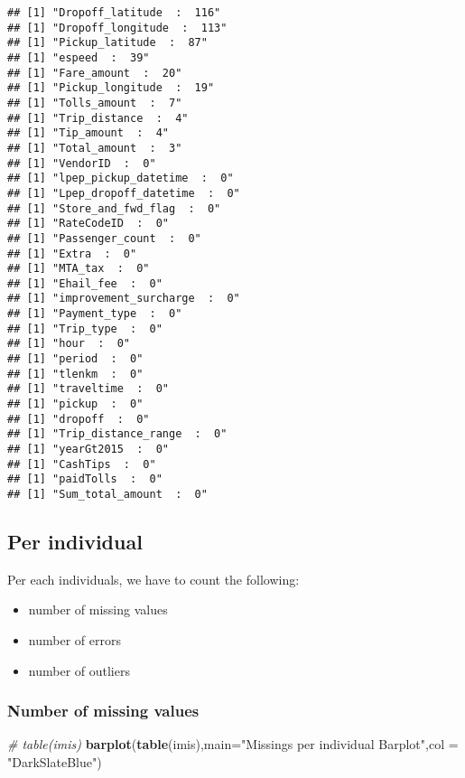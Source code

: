 \documentclass[
  18pt,
  a4paper]{article}
\newenvironment{Shaded}{\begin{snugshade}}{\end{snugshade}}
\newcommand{\CommentTok}[1]{\textcolor[rgb]{0.56,0.35,0.01}{\textit{#1}}}
\newcommand{\DataTypeTok}[1]{\textcolor[rgb]{0.13,0.29,0.53}{#1}}
\newcommand{\KeywordTok}[1]{\textcolor[rgb]{0.13,0.29,0.53}{\textbf{#1}}}
\newcommand{\NormalTok}[1]{#1}
\newcommand{\StringTok}[1]{\textcolor[rgb]{0.31,0.60,0.02}{#1}}
\providecommand{\tightlist}{%
  \setlength{\itemsep}{0pt}\setlength{\parskip}{0pt}}
\begin{document}
\begin{verbatim}
## [1] "Dropoff_latitude  :  116"
## [1] "Dropoff_longitude  :  113"
## [1] "Pickup_latitude  :  87"
## [1] "espeed  :  39"
## [1] "Fare_amount  :  20"
## [1] "Pickup_longitude  :  19"
## [1] "Tolls_amount  :  7"
## [1] "Trip_distance  :  4"
## [1] "Tip_amount  :  4"
## [1] "Total_amount  :  3"
## [1] "VendorID  :  0"
## [1] "lpep_pickup_datetime  :  0"
## [1] "Lpep_dropoff_datetime  :  0"
## [1] "Store_and_fwd_flag  :  0"
## [1] "RateCodeID  :  0"
## [1] "Passenger_count  :  0"
## [1] "Extra  :  0"
## [1] "MTA_tax  :  0"
## [1] "Ehail_fee  :  0"
## [1] "improvement_surcharge  :  0"
## [1] "Payment_type  :  0"
## [1] "Trip_type  :  0"
## [1] "hour  :  0"
## [1] "period  :  0"
## [1] "tlenkm  :  0"
## [1] "traveltime  :  0"
## [1] "pickup  :  0"
## [1] "dropoff  :  0"
## [1] "Trip_distance_range  :  0"
## [1] "yearGt2015  :  0"
## [1] "CashTips  :  0"
## [1] "paidTolls  :  0"
## [1] "Sum_total_amount  :  0"
\end{verbatim}

\hypertarget{per-individual}{%
\subsection{Per individual}\label{per-individual}}

Per each individuals, we have to count the following:

\begin{itemize}
\tightlist
\item
  number of missing values
\item
  number of errors
\item
  number of outliers
\end{itemize}

\hypertarget{number-of-missing-values}{%
\subsubsection{Number of missing
values}\label{number-of-missing-values}}

\begin{Shaded}
\begin{Highlighting}[]
\CommentTok{# table(imis)}
\KeywordTok{barplot}\NormalTok{(}\KeywordTok{table}\NormalTok{(imis),}\DataTypeTok{main=}\StringTok{"Missings per individual Barplot"}\NormalTok{,}\DataTypeTok{col =} \StringTok{"DarkSlateBlue"}\NormalTok{)}
\end{Highlighting}
\end{Shaded}
\end{document}
